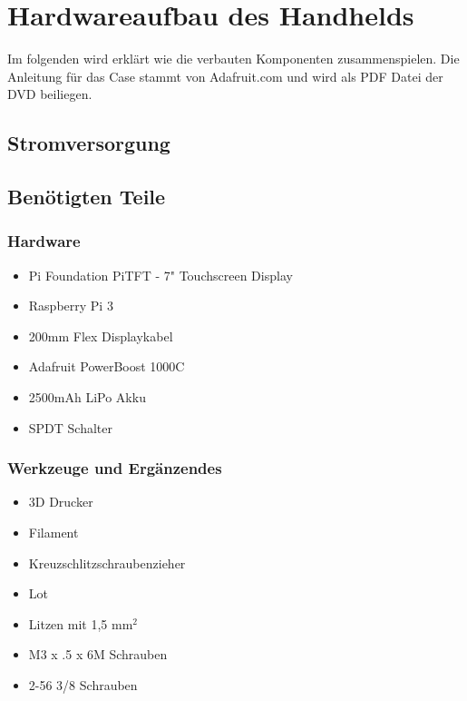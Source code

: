%
%

\chapter{Hardwareaufbau des Handhelds}

Im folgenden wird erklärt wie die verbauten Komponenten zusammenspielen. Die Anleitung für das Case stammt von Adafruit.com und wird als PDF Datei der DVD beiliegen. 

\section{Stromversorgung}


\section{Benötigten Teile}
\subsection{Hardware}
\begin{itemize}
\item Pi Foundation PiTFT - 7" Touchscreen Display 
\item Raspberry Pi 3 
\item 200mm Flex Displaykabel
\item Adafruit PowerBoost 1000C
\item 2500mAh LiPo Akku
\item SPDT Schalter
\end{itemize} 

\subsection{Werkzeuge und Ergänzendes}
\begin{itemize}
\item 3D Drucker 
\item Filament  
\item Kreuzschlitzschraubenzieher 
\item Lot 
\item Litzen mit 1,5 mm$^2$
\item M3 x .5 x 6M Schrauben 
\item 2-56 3/8 Schrauben 
\end{itemize}

